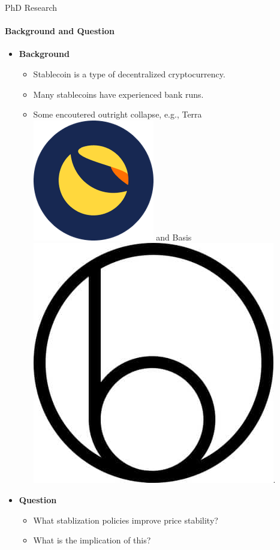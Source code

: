 \documentclass{beamer}
\newlength{\myMheight}
\begin{document}
\begin{frame}{PhD Research}
\framesubtitle{Background and Question}

\begin{itemize}
\item \textbf{Background}
\begin{itemize}

\item Stablecoin is a type of decentralized cryptocurrency.
\item Many stablecoins have experienced bank runs. 
\item Some encoutered outright collapse, e.g., Terra \includegraphics[height=1.2\myMheight]{resources/terra.png} and Basis \includegraphics[height=1.2\myMheight]{resources/basis.jpg}. 
\end{itemize}
\item \textbf{Question}
\begin{itemize}
\item What stablization policies improve price stability?
\item What is the implication of this?
\end{itemize}
\end{itemize}
\end{frame}
\end{document}
